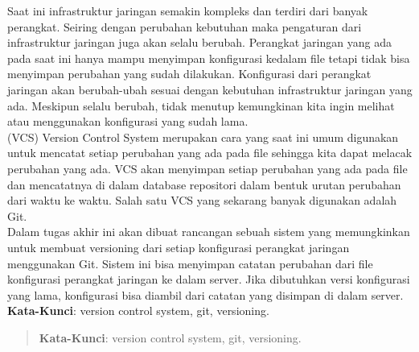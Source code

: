 \begin{abstrak}
        Saat ini infrastruktur jaringan semakin kompleks dan terdiri dari banyak perangkat. Seiring dengan perubahan kebutuhan maka pengaturan dari infrastruktur jaringan juga akan selalu berubah. Perangkat jaringan yang ada pada saat ini hanya mampu menyimpan konfigurasi kedalam file tetapi tidak bisa menyimpan perubahan yang sudah dilakukan. Konfigurasi dari perangkat jaringan akan berubah-ubah sesuai dengan kebutuhan infrastruktur jaringan yang ada. Meskipun selalu berubah, tidak menutup kemungkinan kita ingin melihat atau menggunakan konfigurasi yang sudah lama.\\
		\indent (VCS) Version Control System  merupakan cara yang saat ini umum digunakan untuk mencatat setiap perubahan yang ada pada file sehingga kita dapat melacak perubahan yang ada. VCS akan menyimpan setiap perubahan yang ada pada file dan mencatatnya di dalam database repositori dalam bentuk urutan perubahan dari waktu ke waktu. Salah satu VCS yang sekarang banyak digunakan adalah Git.\\
		\indent Dalam tugas akhir ini akan dibuat rancangan sebuah sistem yang memungkinkan untuk membuat versioning dari setiap konfigurasi perangkat jaringan menggunakan Git. Sistem ini bisa menyimpan catatan perubahan dari file konfigurasi perangkat jaringan ke dalam server. Jika dibutuhkan versi konfigurasi yang lama, konfigurasi bisa diambil dari catatan yang disimpan di dalam server.\\

	\noindent \textbf{Kata-Kunci}: version control system, git, versioning.
\end{abstrak}
\newpage
\begin{abstract}
	

	\noindent \textbf{Kata-Kunci}: version control system, git, versioning.
\end{abstract}